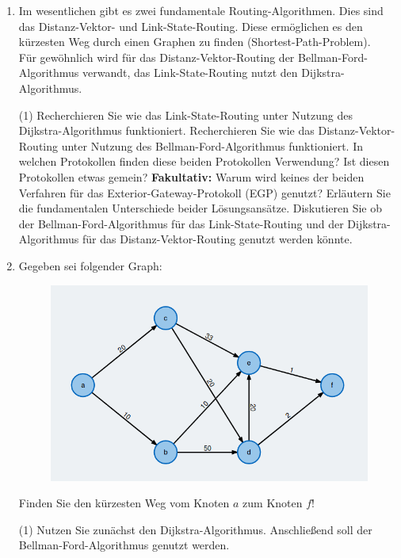\documentclass[paper=a4,fontsize=11pt]{scrartcl}%
\numberwithin{equation}{section}
\begin{document}
\begin{enumerate}
	\item Im wesentlichen gibt es zwei fundamentale Routing-Algorithmen. Dies sind das Distanz-Vektor- und Link-State-Routing. Diese ermöglichen es den kürzesten Weg durch einen Graphen zu finden (Shortest-Path-Problem).\\
	Für gewöhnlich wird für das Distanz-Vektor-Routing der Bellman-Ford-Algorithmus verwandt, das Link-State-Routing nutzt den Dijkstra-Algorithmus.
	\begin{tasks}(1)
		\task Recherchieren Sie wie das Link-State-Routing unter Nutzung des Dijkstra-Algorithmus funktioniert.
		\task Recherchieren Sie wie das Distanz-Vektor-Routing unter Nutzung des Bellman-Ford-Algorithmus funktioniert.
		\task In welchen Protokollen finden diese beiden Protokollen Verwendung? Ist diesen Protokollen etwas gemein?
		\task \textbf{Fakultativ:} Warum wird keines der beiden Verfahren für das Exterior-Gateway-Protokoll (EGP) genutzt?
		\task Erläutern Sie die fundamentalen Unterschiede beider Lösungsansätze.
		\task Diskutieren Sie ob der Bellman-Ford-Algorithmus für das Link-State-Routing und der Dijkstra-Algorithmus für das Distanz-Vektor-Routing genutzt werden könnte.
	\end{tasks}
	\item Gegeben sei folgender Graph:
	\begin{figure}[H]
		\centering
		\includegraphics[scale=0.4]{dijkstra_example}
	\end{figure}
	Finden Sie den kürzesten Weg vom Knoten $a$ zum Knoten $f$!
	\begin{tasks}(1)
		\task Nutzen Sie zunächst den Dijkstra-Algorithmus.
		\task Anschließend soll der Bellman-Ford-Algorithmus genutzt werden. 
	\end{tasks}
\end{enumerate}
\end{document}
